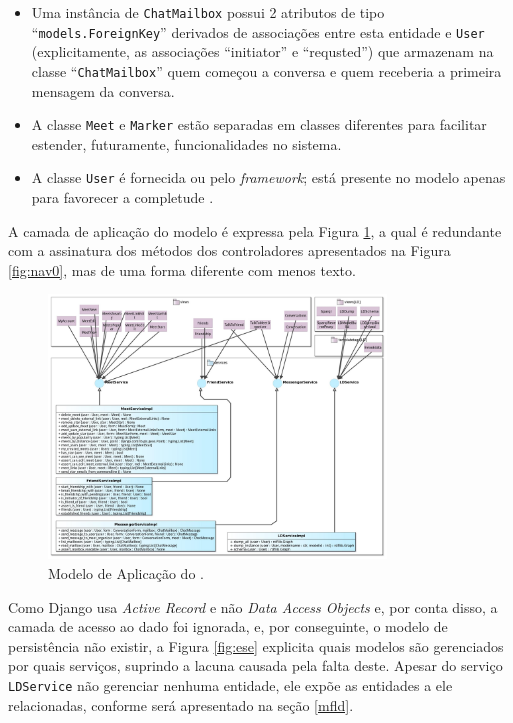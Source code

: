 \begin{itemize}
  \item Uma instância de \texttt{ChatMailbox} possui 2 atributos de tipo ``\texttt{models.ForeignKey}'' derivados de associações entre esta entidade e \texttt{User} (explicitamente, as associações ``initiator'' e ``requsted'') que armazenam na classe ``\texttt{ChatMailbox}'' quem começou a conversa e quem receberia a primeira mensagem da conversa.
  \item A classe \texttt{Meet} e \texttt{Marker} estão separadas em classes diferentes para facilitar estender, futuramente, funcionalidades no sistema.
  \item A classe \texttt{User} é fornecida ou pelo \textit{framework}; está presente no modelo apenas para favorecer a completude .
\end{itemize}

A camada de aplicação do modelo é expressa pela Figura \ref{fig:apl}, a qual é redundante com a assinatura dos métodos dos controladores apresentados na Figura \ref{fig:nav0}, mas de uma forma diferente com menos texto.

\begin{figure}[H]
	\centering
	\includegraphics[width=0.8\textwidth]{figuras/FrameWebApplicationModel.jpg}
	\caption{Modelo de Aplicação do \imprimirtitulo.}
	\label{fig:apl}
\end{figure}

Como Django usa \textit{Active Record} e não \textit{Data Access Objects} e, por conta disso, a camada de acesso ao dado foi ignorada, e, por conseguinte, o modelo de persistência não existir, a Figura \ref{fig:ese} explicita quais modelos são gerenciados por quais serviços, suprindo a lacuna causada pela falta deste. Apesar do serviço \texttt{LDService} não gerenciar nenhuma entidade, ele expõe as entidades a ele relacionadas, conforme será apresentado na seção \ref{mfld}.

